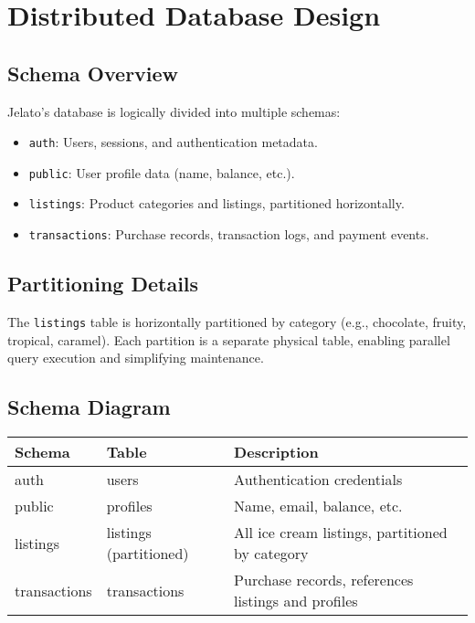 \documentclass[12pt,a4paper]{report}
\begin{document}
\chapter{Distributed Database Design}
\section{Schema Overview}
Jelato’s database is logically divided into multiple schemas:
\begin{itemize}
    \item \texttt{auth}: Users, sessions, and authentication metadata.
    \item \texttt{public}: User profile data (name, balance, etc.).
    \item \texttt{listings}: Product categories and listings, partitioned horizontally.
    \item \texttt{transactions}: Purchase records, transaction logs, and payment events.
\end{itemize}

\section{Partitioning Details}
The \texttt{listings} table is horizontally partitioned by category (e.g., chocolate, fruity, tropical, caramel). Each partition is a separate physical table, enabling parallel query execution and simplifying maintenance.

\section{Schema Diagram}
\begin{center}
\begin{tabular}{|l|l|l|}
\hline
\textbf{Schema} & \textbf{Table} & \textbf{Description} \\
\hline
auth & users & Authentication credentials \\
public & profiles & Name, email, balance, etc. \\
listings & listings (partitioned) & All ice cream listings, partitioned by category \\
transactions & transactions & Purchase records, references listings and profiles \\
\hline
\end{tabular}
\end{center}
\end{document}
